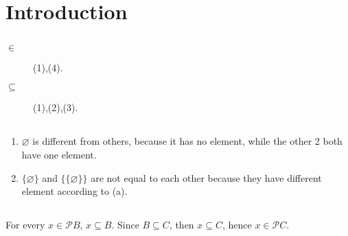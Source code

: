 \chapter{Introduction}

\section{}
\begin{description}
  \item[$\in$] (1),(4).
  \item[$\subseteq$] (1),(2),(3).
\end{description}


\section{}
\begin{enumerate}
  \item $\varnothing$ is different from others, because it has no element, 
        while the other 2 both have one element.
  \item $\{\varnothing\}$ and $\{\{\varnothing\}\}$ are not equal to each
        other because they have different element according to (a).
\end{enumerate}


\section{}
For every $ x \in \mathscr{P}B $, $ x \subseteq B $. Since $ B \subseteq C $,
then $ x \subseteq C $, hence $ x \in \mathscr{P}C $.